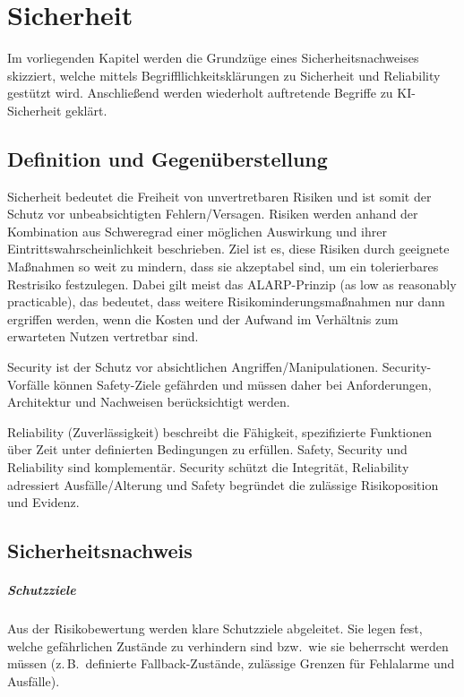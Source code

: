 
\chapter{Sicherheit}\label{sec:safety-aviation}
Im vorliegenden Kapitel werden die Grundzüge eines Sicherheitsnachweises skizziert, 
welche mittels Begriffllichkeitsklärungen zu Sicherheit und Reliability gestützt wird. 
Anschließend werden wiederholt auftretende Begriffe zu KI-Sicherheit geklärt. 



\section{Definition und Gegenüberstellung}\label{sec:safety-basics}
Sicherheit bedeutet die Freiheit von unvertretbaren Risiken und ist somit der Schutz vor unbeabsichtigten Fehlern/Versagen. 
Risiken werden anhand der Kombination aus Schweregrad einer möglichen Auswirkung und ihrer Eintrittswahrscheinlichkeit beschrieben. 
Ziel ist es, diese Risiken durch geeignete Maßnahmen so weit zu mindern, dass sie akzeptabel sind, um ein tolerierbares Restrisiko festzulegen. 
Dabei gilt meist das ALARP-Prinzip (as low as reasonably practicable), das bedeutet, dass weitere Risikominderungsmaßnahmen 
nur dann ergriffen werden, wenn die Kosten und der Aufwand im Verhältnis zum erwarteten Nutzen vertretbar sind.

\medskip
Security ist der Schutz vor absichtlichen Angriffen/Manipulationen. 
Security-Vorfälle können Safety-Ziele gefährden und müssen daher bei Anforderungen, Architektur und Nachweisen berücksichtigt werden. 

\medskip
Reliability (Zuverlässigkeit) beschreibt die Fähigkeit, spezifizierte Funktionen über Zeit unter definierten Bedingungen zu erfüllen. 
Safety, Security und Reliability sind komplementär. Security schützt die Integrität, Reliability adressiert Ausfälle/Alterung und Safety begründet die zulässige Risikoposition und Evidenz.

\section{Sicherheitsnachweis}\label{sec:assurance-logic}

\paragraph{Schutzziele}
Aus der Risikobewertung werden klare Schutzziele abgeleitet. Sie legen fest,
welche gefährlichen Zustände zu verhindern sind bzw.\ wie sie beherrscht werden müssen
(z.\,B.\ definierte Fallback-Zustände, zulässige Grenzen für Fehlalarme und Ausfälle).

